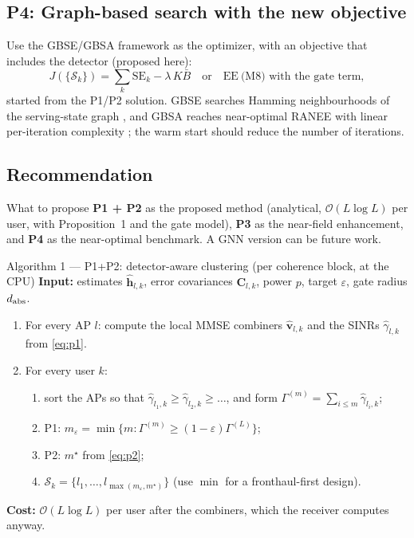 \documentclass[11pt]{article}
\begin{document}
\subsection{P4: Graph-based search with the new objective}
Use the GBSE/GBSA framework \cite{tesolin2026gbse,tesolin2026gbsa} as the optimizer, with an objective that includes the detector (proposed here):
\begin{equation}
  J(\{\mathcal S_k\})=\sum_k \mathrm{SE}_k-\lambda\,K\bar B\quad\text{or}\quad\mathrm{EE}\ \text{(M8) with the gate term},
\end{equation}
started from the P1/P2 solution. GBSE searches Hamming neighbourhoods of the serving-state graph \cite[Sec.~III]{tesolin2026gbse}, and GBSA reaches near-optimal RANEE with linear per-iteration complexity \cite{tesolin2026gbsa}; the warm start should reduce the number of iterations.

\subsection{Recommendation}
\begin{keybox}{What to propose}
\textbf{P1 + P2} as the proposed method (analytical, $\mathcal O(L\log L)$ per user, with Proposition~1 and the gate model), \textbf{P3} as the near-field enhancement, and \textbf{P4} as the near-optimal benchmark. A GNN version \cite{ranasinghe2021gnn,pereira2025gnn} can be future work.
\end{keybox}

\begin{keybox}{Algorithm 1 --- P1+P2: detector-aware clustering (per coherence block, at the CPU)}
\textbf{Input:} estimates $\hat{\mathbf h}_{l,k}$, error covariances $\mathbf C_{l,k}$, power $p$, target $\varepsilon$, gate radius $d_{\rm abs}$.
\begin{enumerate}[leftmargin=*]
  \item For every AP $l$: compute the local MMSE combiners $\hat{\mathbf v}_{l,k}$ and the SINRs $\hat\gamma_{l,k}$ from \eqref{eq:p1}.
  \item For every user $k$:
  \begin{enumerate}
    \item sort the APs so that $\hat\gamma_{l_1,k}\ge\hat\gamma_{l_2,k}\ge\dots$, and form $\Gamma^{(m)}=\sum_{i\le m}\hat\gamma_{l_i,k}$;
    \item P1: $m_\varepsilon=\min\{m:\Gamma^{(m)}\ge(1-\varepsilon)\Gamma^{(L)}\}$;
    \item P2: $m^\star$ from \eqref{eq:p2};
    \item $\mathcal S_k=\{l_1,\dots,l_{\max(m_\varepsilon,m^\star)}\}$ (use $\min$ for a fronthaul-first design).
  \end{enumerate}
\end{enumerate}
\textbf{Cost:} $\mathcal O(L\log L)$ per user after the combiners, which the receiver computes anyway.
\end{keybox}
\end{document}
